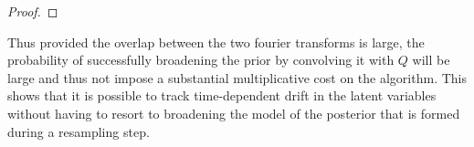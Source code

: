 \documentclass[aps,amsmath,onecolumn,amssymb]{revtex4}
\begin{document}
\begin{proof}
\end{proof}

Thus provided the overlap between the two fourier transforms is large, the probability of successfully broadening the prior by convolving it with $Q$ will be large and thus not impose a substantial multiplicative cost on the algorithm.  This shows that it is possible to track time-dependent drift in the latent variables without having to resort to broadening the model of the posterior that is formed during a resampling step.


\end{document}
